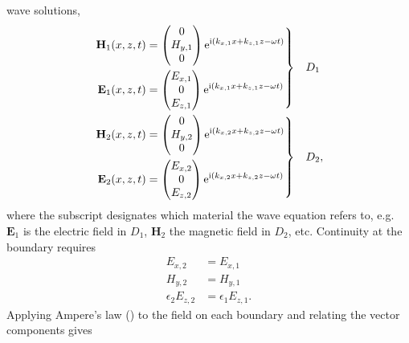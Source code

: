 wave solutions,
\begin{align}
  \left.\begin{aligned}
    \mathbf{H}_1(x,z,t) & =
    \begin{pmatrix}
      0       \\
      H_{y,1} \\
      0
    \end{pmatrix} {\mathrm{e}}^{{\mathrm{i}}(k_{x,1}x+k_{z,1}z-\omega t)} \\
    \mathbf{E}_1(x,z,t) & =
    \begin{pmatrix}
      E_{x,1} \\
      0       \\
      E_{z,1} \\
    \end{pmatrix} {\mathrm{e}}^{{\mathrm{i}}(k_{x,1}x+k_{z,1}z-\omega t)}
  \end{aligned}
  \right\} & \quad D_1\label{eqn:planewavedielectric} \\
  \left.\begin{aligned}
    \mathbf{H}_2(x,z,t) & =
    \begin{pmatrix}
      0       \\
      H_{y,2} \\
      0
    \end{pmatrix}
    {\mathrm{e}}^{{\mathrm{i}}(k_{x,2}x+k_{z,2}z-\omega t)} \\
    \mathbf{E}_2(x,z,t) & =
    \begin{pmatrix}
      E_{x,2} \\
      0       \\
      E_{z,2} \\
    \end{pmatrix}
    {\mathrm{e}}^{{\mathrm{i}}(k_{x,2}x+k_{z,2}z-\omega t)}
  \end{aligned}
  \right\} & \quad D_2,
  \label{eqn:planewavemetal}
\end{align}
where the subscript designates which material the wave equation refers to,
e.g.\ $\mathbf{E}_1$ is the electric field in $D_1$, $\mathbf{H}_2$
the magnetic field in $D_2$, etc. Continuity at the boundary
requires
\begin{align}
  E_{x,2}            & =E_{x,1}             \\
  H_{y,2}            & =H_{y,1}             \\
  \epsilon_2 E_{z,2} & =\epsilon_1 E_{z,1}.
\end{align}
Applying Ampere's law () to the field on
each boundary and relating the vector components gives
